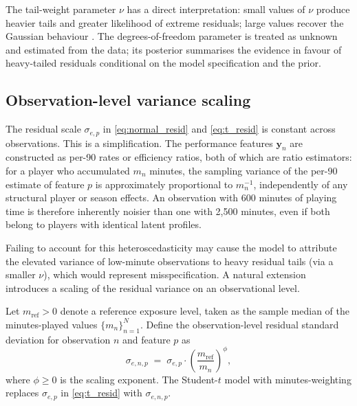 The tail-weight parameter $\nu$ has a direct interpretation: small values of $\nu$ produce heavier tails and greater likelihood of extreme residuals; large values recover the Gaussian behaviour \cite{lange1989robust,geweke1993bayesian}. The degrees-of-freedom parameter is treated as unknown and estimated from the data; its posterior summarises the evidence in favour of heavy-tailed residuals conditional on the model specification and the prior.

\subsection{Observation-level variance scaling}
\label{sec:phi}

The residual scale $\sigma_{e,p}$ in \eqref{eq:normal_resid} and \eqref{eq:t_resid} is constant across observations. This is a simplification. The performance features $\mathbf{y}_n$ are constructed as per-90 rates or efficiency ratios, both of which are ratio estimators: for a player who accumulated $m_n$ minutes, the sampling variance of the per-90 estimate of feature $p$ is approximately proportional to $m_n^{-1}$, independently of any structural player or season effects. An observation with 600 minutes of playing time is therefore inherently noisier than one with 2{,}500 minutes, even if both belong to players with identical latent profiles.

Failing to account for this heteroscedasticity may cause the model to attribute the elevated variance of low-minute observations to heavy residual tails (via a smaller $\nu$), which would represent misspecification. A natural extension introduces a scaling of the residual variance on an observational level.

\begin{definition}
\label{def:phi}
Let $m_{\mathrm{ref}} > 0$ denote a reference exposure level, taken as the sample median of the minutes-played values $\{m_n\}_{n=1}^N$. Define the observation-level residual standard deviation for observation $n$ and feature $p$ as
\begin{equation}
\sigma_{e,n,p} \;=\; \sigma_{e,p} \cdot \left(\frac{m_{\mathrm{ref}}}{m_n}\right)^{\!\phi},
\label{eq:phi_scaling}
\end{equation}
where $\phi \geq 0$ is the scaling exponent. The Student-$t$ model with minutes-weighting replaces $\sigma_{e,p}$ in \eqref{eq:t_resid} with $\sigma_{e,n,p}$.
\end{definition}

